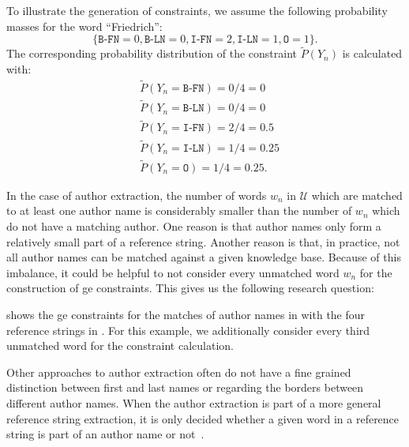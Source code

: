 To illustrate the generation of constraints, we assume the following probability masses for the word ``Friedrich'':
\begin{equation*}
  \{\texttt{B-FN}{=}0,\texttt{B-LN}{=}0,\texttt{I-FN}{=}2,\texttt{I-LN}{=}1,\texttt{O}{=}1\}.
\end{equation*}
The corresponding \gls{probability distribution} of the constraint $\tilde{P}(Y_n)$ is calculated with:
\begin{equation*}
\begin{split}
  &\tilde{P}(Y_n{=}\texttt{B-FN})=0/4=0\\
  &\tilde{P}(Y_n{=}\texttt{B-LN})=0/4=0\\
  &\tilde{P}(Y_n{=}\texttt{I-FN})=2/4=0.5\\
  &\tilde{P}(Y_n{=}\texttt{I-LN})=1/4=0.25\\
  &\tilde{P}(Y_n{=}\texttt{O})=1/4=0.25.
\end{split}
\end{equation*}

\bigskip

In the case of author extraction, the number of words $w_n$ in $\mathcal{U}$ which are matched to at least one author name is considerably smaller than the number of $w_n$ which do not have a matching author.
One reason is that author names only form a relatively small part of a reference string.
Another reason is that, in practice, not all author names can be matched against a given knowledge base.
Because of this imbalance, it could be helpful to not consider every unmatched word $w_n$ for the construction of \gls{ge} constraints.
This gives us the following research question:
\newcommand\researchquestionfour{}
\researchquestionfour%

 shows the \gls{ge} constraints for the matches of author names in  with the four reference strings in .
For this example, we additionally consider every third unmatched word for the constraint calculation.

\bigskip

Other approaches to author extraction often do not have a fine grained distinction between first and last names or regarding the borders between different author names.
When the author extraction is part of a more general reference string extraction, it is only decided whether a given word in a reference string is part of an author name or not~\citep{chen1999gaussian,councill2008parscit,wu2014citeseerx,bellare2007learning}.

